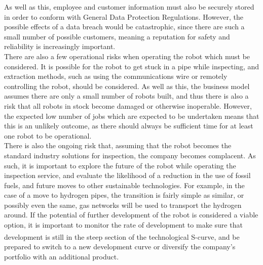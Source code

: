 \documentclass[11pt]{article}		%
\newcommand{\supercite}[1]{\textsuperscript{\cite{#1}}}		%
\begin{document}
     	As well as this, employee and customer information must also be securely stored in order to conform with General Data Protection Regulations.
     	However, the possible effects of a data breach would be catastrophic, since there are such a small number of possible customers, meaning a reputation for safety and reliability is increasingly important.
     	\\
     	There are also a few operational risks when operating the robot which must be considered.
     	It is possible for the robot to get stuck in a pipe while inspecting, and extraction methods, such as using the communications wire or remotely controlling the robot, should be considered.
     	As well as this, the business model assumes there are only a small number of robots built, and thus there is also a risk that all robots in stock become damaged or otherwise inoperable.
     	However, the expected low number of jobs which are expected to be undertaken means that this is an unlikely outcome, as there should always be sufficient time for at least one robot to be operational.
     	\\
     	There is also the ongoing risk that, assuming that the robot becomes the standard industry solutions for inspection, the company becomes complacent.
     	As such, it is important to explore the future of the robot while operating the inspection service, and evaluate the likelihood of a reduction in the use of fossil fuels, and future moves to other sustainable technologies.
     	For example, in the case of a move to hydrogen pipes, the transition is fairly simple as similar, or possibly even the same, gas networks will be used to transport the hydrogen around.
     	If the potential of further development of the robot is considered a viable option, it is important to monitor the rate of development to make sure that development is still in the steep section of the technological S-curve\supercite{christensen1998innovation}, and be prepared to switch to a new development curve or diversify the company's portfolio with an additional product.
     	
	
	\pagebreak		%
	
	
	
	
	\begingroup\onehalfspacing
		{\small
			
			
		}
	\endgroup
\end{document}
